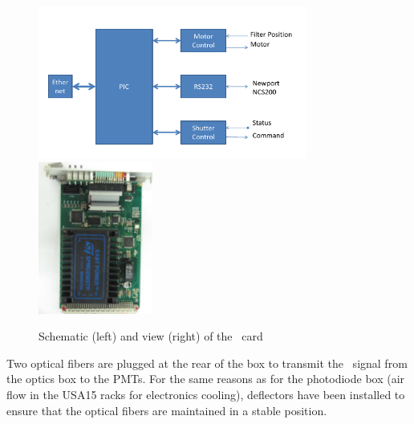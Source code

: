 \begin{itemize}
\begin{figure}[htbp]
\centering
\includegraphics[height=5cm]{figures/licmot_scheme.pdf}
\includegraphics[height=5cm]{figures/licmot.JPG}
\caption{Schematic (left) and view (right) of the \licmot~card}\label{fig:laslicmot}
\end{figure}

\end{itemize}

Two optical fibers are plugged at the rear of the box to transmit the \laser~signal from the optics box to the PMTs. For the same reasons as for the photodiode box (air flow in the USA15 racks for electronics cooling), deflectors have been installed to ensure that the optical fibers are maintained in a stable position.

